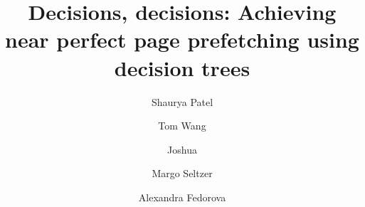 \documentclass[sigplan, screen,10pt]{acmart}
\begin{document}
\sloppy
\title{Decisions, decisions: Achieving near perfect page prefetching using decision trees}

 \author{Shaurya Patel}

  \author{Tom Wang}

 

  \author{Joshua}

 \author{Margo Seltzer}
 
  \author{Alexandra Fedorova}

\renewcommand{\shortauthors}{Patel, et al.}

\begin{abstract}

\end{abstract}




\maketitle
















\end{document}
